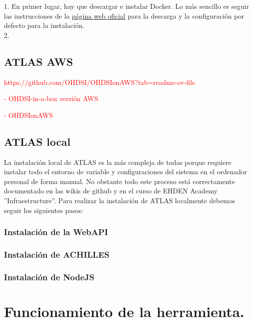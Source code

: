\documentclass{article}
\begin{document}
1. En primer lugar, hay que descargar e instalar Docker. Lo más sencillo es seguir las instrucciones de la \href{https://docs.docker.com/engine/install/}{página web oficial} para la descarga y la configuración por defecto para la instalación. \\

2. 










\newpage
\subsection{ATLAS AWS}\label{cap:AtlasAWS}

\textcolor{red}{https://github.com/OHDSI/OHDSIonAWS?tab=readme-ov-file}

\textcolor{red}{- OHDSI-in-a-box versión AWS}

\textcolor{red}{- OHDSIonAWS}


\subsection{ATLAS local }

La instalación local de ATLAS es la más compleja de todas porque requiere instalar todo el entorno de variable y configuraciones del sistema en el ordenador personal de forma manual. No obstante todo este proceso está correctamente documentado en las wikis de github \cite{AtlasSetup} y en el curso de EHDEN Academy \cite{EHDENAcademy} ''Infraestructure''. Para realizar la instalación de ATLAS localmente debemos seguir los siguientes pasos:

\subsubsection{Instalación de la WebAPI}

\subsubsection{Instalación de ACHILLES}

\subsubsection{Instalación de NodeJS}





\newpage
\section{Funcionamiento de la herramienta.}




\newpage


\end{document}
